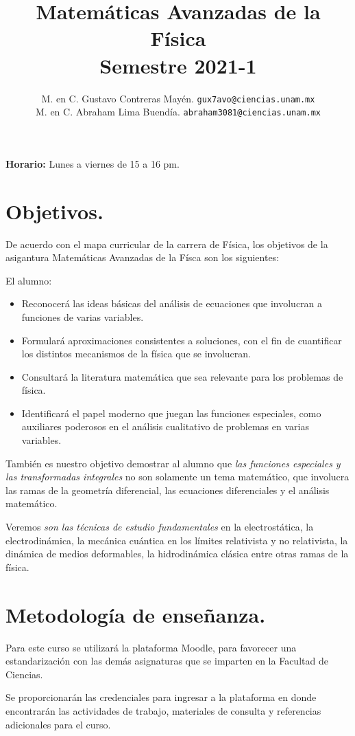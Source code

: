 \documentclass[12pt]{article}
\author{M. en C. Gustavo Contreras Mayén. \texttt{gux7avo@ciencias.unam.mx}\\
M. en C. Abraham Lima Buendía. \texttt{abraham3081@ciencias.unam.mx}}
\title{Matemáticas Avanzadas de la Física \\ {\large Semestre 2021-1}}
\date{ }
\begin{document}
\vspace{-4cm}
\renewcommand\labelenumii{\theenumi.{\arabic{enumii}}}
\maketitle
\fontsize{14}{14}\selectfont
\textbf{Horario: } Lunes a viernes de 15 a 16 pm.
\section{Objetivos.}
De acuerdo con el mapa curricular de la carrera de Física, los objetivos de la asigantura Matemáticas Avanzadas de la Físca son los siguientes:
\par
El alumno:
\begin{itemize}
\setlength{\itemsep}{0mm}
\item Reconocerá las ideas básicas del análisis de ecuaciones que involucran a funciones de varias variables.
\item Formulará aproximaciones consistentes a soluciones, con el fin de cuantificar los distintos mecanismos de la física que se involucran.
\item Consultará la literatura matemática que sea relevante para los problemas de física.
\item Identificará el papel moderno que juegan las funciones especiales, como auxiliares poderosos en el análisis cualitativo de problemas en varias variables.
\end{itemize}

También es nuestro objetivo demostrar al alumno que \emph{las funciones especiales y las transformadas integrales} no son solamente un tema matemático, que involucra las ramas de la geometría diferencial, las ecuaciones diferenciales y el análisis matemático.
\par
Veremos \emph{son las técnicas de estudio fundamentales} en la electrostática, la electrodinámica, la mecánica cuántica en los límites relativista y no relativista, la dinámica de medios deformables, la hidrodinámica clásica entre otras ramas de la física.

\section{Metodología de enseñanza.}

Para este curso se utilizará la plataforma Moodle, para favorecer una estandarización con las demás asignaturas que se imparten en la Facultad de Ciencias.
\par
Se proporcionarán las credenciales para ingresar a la plataforma en donde encontrarán las actividades de trabajo, materiales de consulta y referencias adicionales para el curso.
\end{document}
